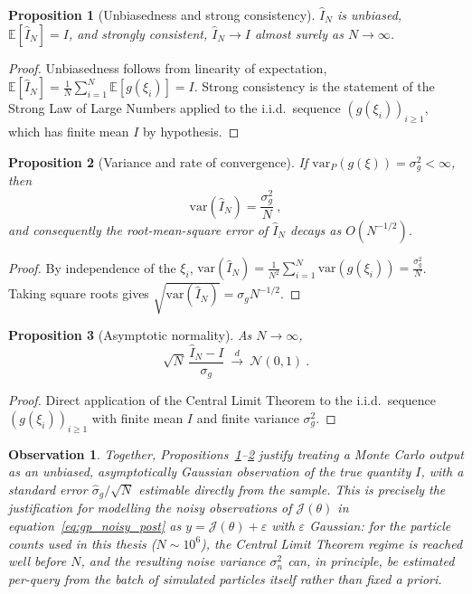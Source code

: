 \documentclass{article}
\newtheorem{prop}{Proposition}
\newtheorem{obs}{Observation}
\begin{document}
	\begin{prop}[Unbiasedness and strong consistency] \label{prop:mc_unbiased}
		$\hat{I}_N$ is unbiased, $\mathbb{E}[\hat{I}_N] = I$, and strongly consistent, $\hat{I}_N \to I$ almost surely as $N \to \infty$.
	\end{prop}
	\begin{proof}
		Unbiasedness follows from linearity of expectation, $\mathbb{E}[\hat{I}_N] = \frac{1}{N}\sum_{i=1}^N \mathbb{E}[g(\xi_i)] = I$. Strong consistency is the statement of the Strong Law of Large Numbers applied to the i.i.d.\ sequence $(g(\xi_i))_{i \ge 1}$, which has finite mean $I$ by hypothesis.
	\end{proof}
	
	\begin{prop}[Variance and rate of convergence] \label{prop:mc_variance}
		If $\mathrm{var}_P(g(\xi)) = \sigma_g^2 < \infty$, then
		\begin{equation}
			\mathrm{var}(\hat{I}_N) = \frac{\sigma_g^2}{N} \ ,
		\end{equation}
		and consequently the root-mean-square error of $\hat{I}_N$ decays as $O(N^{-1/2})$.
	\end{prop}
	\begin{proof}
		By independence of the $\xi_i$, $\mathrm{var}(\hat{I}_N) = \frac{1}{N^2}\sum_{i=1}^N \mathrm{var}(g(\xi_i)) = \frac{\sigma_g^2}{N}$. Taking square roots gives $\sqrt{\mathrm{var}(\hat{I}_N)} = \sigma_g N^{-1/2}$.
	\end{proof}
	
	\begin{prop}[Asymptotic normality]
		As $N \to \infty$,
		\begin{equation}
			\sqrt{N} \, \frac{\hat{I}_N - I}{\sigma_g} \ \xrightarrow{d} \ \mathcal{N}(0, 1) \ .
		\end{equation}
	\end{prop}
	\begin{proof}
		Direct application of the Central Limit Theorem to the i.i.d.\ sequence $(g(\xi_i))_{i \ge 1}$ with finite mean $I$ and finite variance $\sigma_g^2$.
	\end{proof}
	
	\begin{obs} \label{obs:mc_error}
		Together, Propositions~\ref{prop:mc_unbiased}--\ref{prop:mc_variance} justify treating a Monte Carlo output as an unbiased, asymptotically Gaussian observation of the true quantity $I$, with a standard error $\hat\sigma_g/\sqrt{N}$ estimable directly from the sample. This is precisely the justification for modelling the noisy observations of $\mathcal{J}(\theta)$ in equation~\eqref{eq:gp_noisy_post} as $y = \mathcal{J}(\theta) + \varepsilon$ with $\varepsilon$ Gaussian: for the particle counts used in this thesis ($N \sim 10^6$), the Central Limit Theorem regime is reached well before $N$, and the resulting noise variance $\sigma_n^2$ can, in principle, be estimated per-query from the batch of simulated particles itself rather than fixed a priori.
	\end{obs}
	
\end{document}
